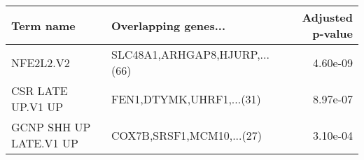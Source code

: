 \begin{tabular}{llr}
\toprule
             Term name &          Overlapping genes... &  Adjusted p-value \\
\midrule
             NFE2L2.V2 & SLC48A1,ARHGAP8,HJURP,...(66) &          4.60e-09 \\
     CSR LATE UP.V1 UP &      FEN1,DTYMK,UHRF1,...(31) &          8.97e-07 \\
GCNP SHH UP LATE.V1 UP &     COX7B,SRSF1,MCM10,...(27) &          3.10e-04 \\
\bottomrule
\end{tabular}
